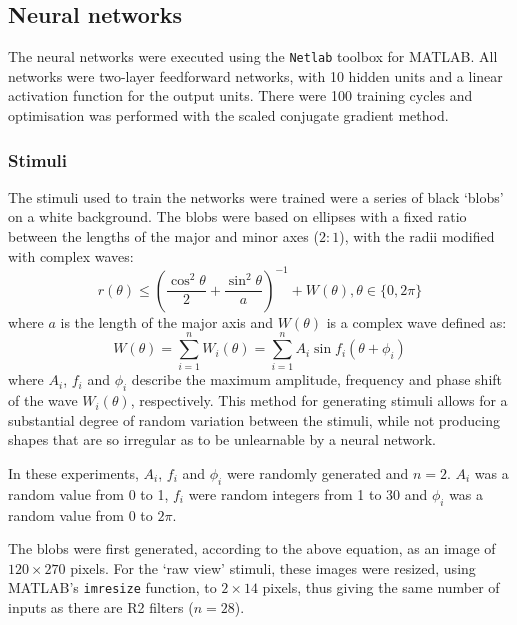 \documentclass[10pt]{article}
\newcommand{\Matlab}{MATLAB}
\begin{document}
\subsection*{Neural networks}
\label{sec:methods:neuralnetworks}
The neural networks were executed using the \texttt{Netlab} toolbox for \Matlab.
All networks were two-layer feedforward networks, with 10 hidden units and a linear activation function for the output units.
There were 100 training cycles and optimisation was performed with the scaled conjugate gradient method.

\subsubsection*{Stimuli}
\label{sec:methods:stimuli}
The stimuli used to train the networks were trained were a series of black `blobs' on a white background.
The blobs were based on ellipses with a fixed ratio between the lengths of the major and minor axes ($2:1$), with the radii modified with complex waves:
$$
r(\theta) \le \left(\frac{\cos^2 \theta}{2} + \frac{\sin^2 \theta}{a} \right)^{-1} + W(\theta), \theta \in \{0, 2\pi\}
$$
where $a$ is the length of the major axis and $W(\theta)$ is a complex wave defined as:
$$
W(\theta) = \sum_{i=1}^n W_i(\theta) = \sum_{i=1}^n A_i \sin f_i (\theta+\phi_i) 
$$
where $A_i$, $f_i$ and $\phi_i$ describe the maximum amplitude, frequency and phase shift of the wave $W_i(\theta)$, respectively.
This method for generating stimuli allows for a substantial degree of random variation between the stimuli, while not producing shapes that are so irregular as to be unlearnable by a neural network.

In these experiments, $A_i$, $f_i$ and $\phi_i$ were randomly generated and $n=2$.
$A_i$ was a random value from 0 to 1, $f_i$ were random integers from 1 to 30 and $\phi_i$ was a random value from 0 to $2\pi$.
\begin{comment}
nvar = 1000;
nwave = 2;
maxfreq = 30;
maxamp = 1;
\end{comment}

The blobs were first generated, according to the above equation, as an image of $120\times 270$ pixels.
For the `raw view' stimuli, these images were resized, using \Matlab's \texttt{imresize} function, to $2\times 14$ pixels, thus giving the same number of inputs as there are R2 filters ($n=28$).
\end{document}
